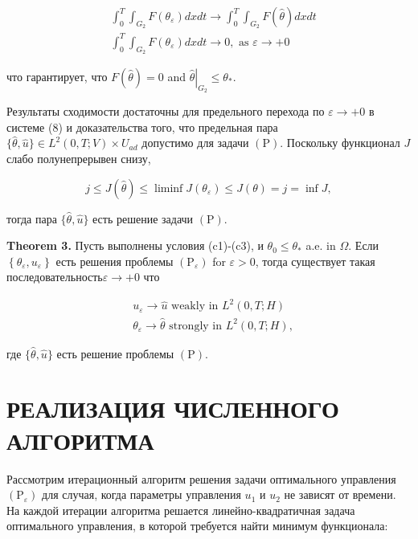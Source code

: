 \[
\begin{aligned}
&\int_{0}^{T} \int_{G_{2}} F\left(\theta_{\varepsilon}\right) d x d t
 \rightarrow \int_{0}^{T} \int_{G_{2}} F(\widehat{\theta}) d x d t \\
&\int_{0}^{T} \int_{G_{2}} F\left(\theta_{\varepsilon}\right) d x d t
\rightarrow 0, \text { as } \varepsilon \rightarrow+0
\end{aligned}
\]

что гарантирует, что $F(\widehat{\theta})=0$ and $\left.\widehat{\theta}\right|_{G_{2}} \leq \theta_{*}$.

Результаты сходимости достаточны для предельного перехода по $\varepsilon \rightarrow+0$ в системе (8)
и доказательства того, что предельная пара
$\{\widehat{\theta}, \widehat{u}\} \in L ^{2}(0, T ; V) \times U_{a d}$
допустимо для задачи $(\mathrm{P})$.
Поскольку функционал $J$ слабо полунепрерывен снизу,

\[
j \leq J(\widehat{\theta}) \leq \liminf J\left(\theta_{\varepsilon}\right) \leq J(\theta)=j=\inf J,
\]

тогда пара $\{\widehat{\theta}, \widehat{u}\}$ есть решение задачи $(\mathrm{P})$.

\textbf{Theorem 3.}
Пусть выполнены условия (c1)-(c3), и $\theta_{0} \leq \theta_{*}$ a.e. in $\Omega$.
Если $\left\{\theta_{\varepsilon}, u_{\varepsilon}\right\}$ есть решения проблемы
$\left(\mathrm{P}_{\varepsilon}\right)$ for $\varepsilon>0$, тогда существует
такая последовательность$\varepsilon \rightarrow+0$ что


\[
\begin{aligned}
&u_{\varepsilon} \rightarrow \widehat{u} \text { weakly in } L^{2}(0, T ; H) \\
&\theta_{\varepsilon} \rightarrow \widehat{\theta} \text { strongly in } L^{2}(0, T ; H),
\end{aligned}
\]


где $\{\widehat{\theta}, \widehat{u}\}$ есть решение проблемы $(\mathrm{P})$.

\section{РЕАЛИЗАЦИЯ ЧИСЛЕННОГО АЛГОРИТМА}

Рассмотрим итерационный алгоритм решения задачи оптимального управления
$\left(\mathrm{P}_{\varepsilon}\right)$ для случая, когда параметры управления
$u_{1}$ и $u_{2}$ не зависят от времени.
На каждой итерации алгоритма
решается линейно-квадратичная задача оптимального управления, в которой требуется найти минимум функционала:

